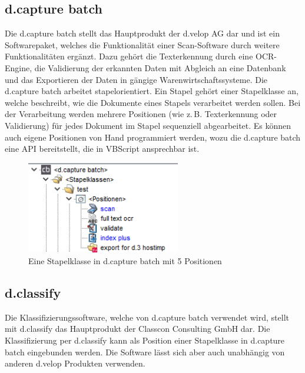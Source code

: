 \documentclass{whswinvcbook}
\begin{document}
\subsection{d.capture batch}
Die d.capture batch stellt das Hauptprodukt der d.velop AG dar und ist ein Softwarepaket, welches die Funktionalität einer Scan-Software durch weitere Funktionalitäten ergänzt. Dazu gehört die Texterkennung durch eine OCR-Engine, die Validierung der erkannten Daten mit Abgleich an eine Datenbank und das Exportieren der Daten in gängige Warenwirtschaftssysteme. Die d.capture batch arbeitet stapelorientiert. Ein Stapel gehört einer Stapelklasse an, welche beschreibt, wie die Dokumente eines Stapels verarbeitet werden sollen. Bei der Verarbeitung werden mehrere Positionen (wie z.\,B. Texterkennung oder Validierung) für jedes Dokument im Stapel sequenziell abgearbeitet. Es können auch eigene Positionen von Hand programmiert werden, wozu die d.capture batch eine API bereitstellt, die in VBScript ansprechbar ist.
\begin{figure}[H]
    \centering
    \includegraphics[width=0.60\textwidth]{img/dcapture_positionen.png}
    \caption{Eine Stapelklasse in d.capture batch mit 5 Positionen}
    \label{fig-dcapture-positionen}
\end{figure}
\subsection{d.classify}
Die Klassifizierungssoftware, welche von d.capture batch verwendet wird, stellt mit d.classify das Hauptprodukt der Classcon Consulting GmbH dar. Die Klassifizierung per d.classify kann als Position einer Stapelklasse in d.capture batch eingebunden werden. Die Software lässt sich aber auch unabhängig von anderen d.velop Produkten verwenden.
\end{document}
